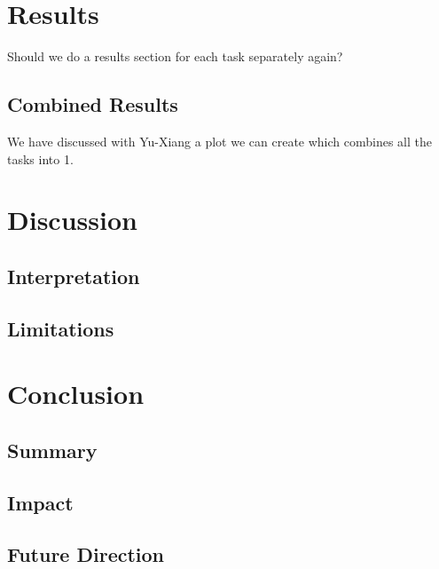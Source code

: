 \documentclass[12pt,letterpaper]{article}
\begin{document}
\section{Results}

Should we do a results section for each task separately again?


\subsection{Combined Results}

We have discussed with Yu-Xiang a plot we can create which combines all the tasks into 1. 



\section{Discussion}


\subsection{Interpretation}


\subsection{Limitations}




\section{Conclusion}


\subsection{Summary}


\subsection{Impact}


\subsection{Future Direction}


\end{document}

